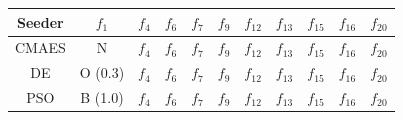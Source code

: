 \documentclass{sig-alternate}
\begin{document}
\begin{table}
    \label{table:pkvalues}
    \begin{tabular}{|c|c|c|c|c|c|c|c|c|c|c|}
        \hline
        Seeder & $f_1$      & $f_4$ & $f_6$ & $f_7$ & $f_9$ & $f_{12}$ & $f_{13}$ & $f_{15}$ & $f_{16}$ & $f_{20}$ \\\hline
        CMAES  & N           & $f_4$ & $f_6$ & $f_7$ & $f_9$ & $f_{12}$ & $f_{13}$ & $f_{15}$ & $f_{16}$ & $f_{20}$ \\
        DE     & O (0.3)     & $f_4$ & $f_6$ & $f_7$ & $f_9$ & $f_{12}$ & $f_{13}$ & $f_{15}$ & $f_{16}$ & $f_{20}$ \\
        PSO    & B (1.0)     & $f_4$ & $f_6$ & $f_7$ & $f_9$ & $f_{12}$ & $f_{13}$ & $f_{15}$ & $f_{16}$ & $f_{20}$ \\
    \end{tabular}
\end{table}
\end{document}
